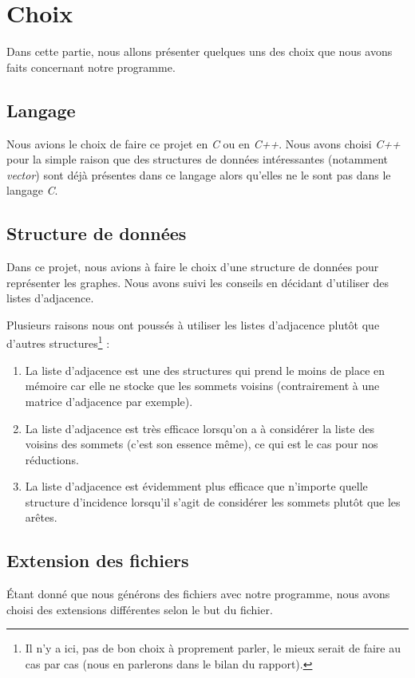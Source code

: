  \section{Choix}
 Dans cette partie, nous allons présenter quelques uns des choix que
 nous avons faits concernant notre programme.

  \subsection{Langage}
  Nous avions le choix de faire ce projet en \emph{C} ou en
  \emph{C++}. Nous avons choisi \emph{C++} pour la simple raison que des
  structures de données intéressantes (notamment \emph{vector}) sont
  déjà présentes dans ce langage alors qu'elles ne le sont pas dans le
  langage \emph{C}.
  
  \subsection{Structure de données}
  Dans ce projet, nous avions à faire le choix d'une structure de
  données pour représenter les graphes. Nous avons suivi les conseils en
  décidant d'utiliser des listes d'adjacence.

  Plusieurs raisons nous ont poussés à utiliser les listes d'adjacence
  plutôt que d'autres structures\footnote{Il n'y a ici, pas de bon choix
  à proprement parler, le mieux serait de faire au cas par cas (nous en
  parlerons dans le bilan du rapport).} :
  \begin{enumerate}
   \item La liste d'adjacence est une des structures qui prend le moins
	 de place en mémoire car elle ne stocke que les sommets voisins
	 (contrairement à une matrice d'adjacence par exemple).
   \item La liste d'adjacence est très efficace lorsqu'on a à
	 considérer la liste des voisins des sommets (c'est son essence
	 même), ce qui est le cas pour nos réductions.
   \item La liste d'adjacence est évidemment plus efficace que n'importe
	 quelle structure d'incidence lorsqu'il s'agit de considérer les
	 sommets plutôt que les arêtes.
  \end{enumerate}

  

  \subsection{Extension des fichiers}
  Étant donné que nous générons des fichiers avec notre programme, nous
  avons choisi des extensions différentes selon le but du fichier.

